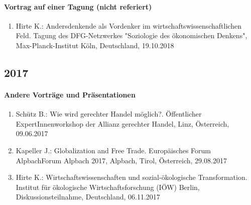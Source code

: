 \paragraph{Vortrag auf einer Tagung (nicht referiert)}
\begin{enumerate}
	\item Hirte K.: Andersdenkende als Vordenker im wirtschaftswissenschaftlichen Feld. Tagung des DFG-Netzwerkes "Soziologie des ökonomischen Denkens", Max-Planck-Institut Köln, Deutschland, 19.10.2018
\end{enumerate}
\subsection*{2017}
\paragraph{Andere Vorträge und Präsentationen}
\begin{enumerate}
	\item Schütz B.: Wie wird gerechter Handel möglich?. Öffentlicher ExpertInnenworkshop der Allianz gerechter Handel, Linz, Österreich, 09.06.2017
	\item Kapeller J.: Globalization and Free Trade. Europäisches Forum AlpbachForum Alpbach 2017, Alpbach, Tirol, Österreich, 29.08.2017
	\item Hirte K.: Wirtschaftswissenschaften und sozial-ökologische Transformation. Institut für ökologische Wirtschaftsforschung (IÖW) Berlin, Diskussionsteilnahme, Deutschland, 06.11.2017
\end{enumerate}
